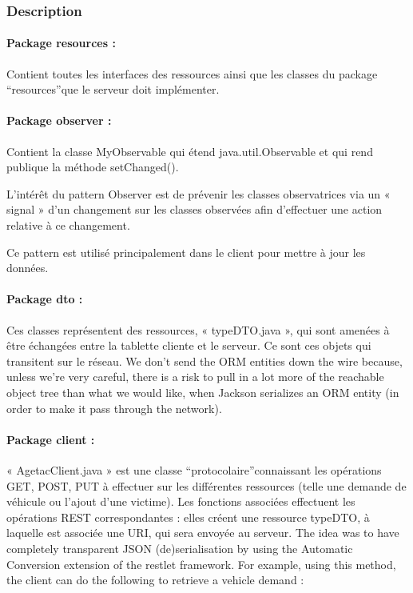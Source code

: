 \documentclass{article}
\begin{document}
\subsubsection{Description}

\paragraph{Package resources :}

Contient toutes les interfaces des ressources ainsi que les classes 
du package ``resources''que le serveur doit implémenter.

\paragraph{Package observer :}

Contient la classe MyObservable qui étend java.util.Observable 
et qui rend publique la méthode setChanged().

L'intérêt du pattern Observer est de prévenir les classes observatrices 
via un « signal » d'un changement sur les classes observées afin d'effectuer 
une action relative à ce changement.

Ce pattern est utilisé principalement dans le client pour mettre 
à jour les données.

\paragraph{Package dto :}

Ces classes représentent des ressources, « typeDTO.java », 
qui sont amenées à être échangées entre la tablette cliente et le serveur. 
Ce sont ces objets qui transitent sur le réseau. We don't send the ORM entities 
down the wire because, unless we're very careful, there is a risk to pull in a 
lot more of the reachable object tree than what we would like, when Jackson serializes 
an ORM entity (in order to make it pass through the network).

\paragraph{Package client :}

« AgetacClient.java » est une classe ``protocolaire''connaissant 
les opérations GET, POST, PUT à effectuer sur les différentes ressources (telle 
une demande de véhicule ou l'ajout d'une victime). Les fonctions associées effectuent 
les opérations REST correspondantes : elles créent une ressource typeDTO, à 
laquelle est associée une URI, qui sera envoyée au serveur. The idea was to have 
completely transparent JSON (de)serialisation by using the Automatic 
Conversion extension of the restlet framework. For example, 
using this method, the client can do the following to retrieve a vehicle demand :
\end{document}
